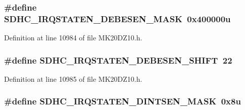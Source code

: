 \subsubsection[{\texorpdfstring{S\+D\+H\+C\+\_\+\+I\+R\+Q\+S\+T\+A\+T\+E\+N\+\_\+\+D\+E\+B\+E\+S\+E\+N\+\_\+\+M\+A\+SK}{SDHC_IRQSTATEN_DEBESEN_MASK}}]{\setlength{\rightskip}{0pt plus 5cm}\#define S\+D\+H\+C\+\_\+\+I\+R\+Q\+S\+T\+A\+T\+E\+N\+\_\+\+D\+E\+B\+E\+S\+E\+N\+\_\+\+M\+A\+SK~0x400000u}\hypertarget{group___s_d_h_c___register___masks_ga1a3c5402282178d4d694355f5bca0870}{}\label{group___s_d_h_c___register___masks_ga1a3c5402282178d4d694355f5bca0870}


Definition at line 10984 of file M\+K20\+D\+Z10.\+h.

\subsubsection[{\texorpdfstring{S\+D\+H\+C\+\_\+\+I\+R\+Q\+S\+T\+A\+T\+E\+N\+\_\+\+D\+E\+B\+E\+S\+E\+N\+\_\+\+S\+H\+I\+FT}{SDHC_IRQSTATEN_DEBESEN_SHIFT}}]{\setlength{\rightskip}{0pt plus 5cm}\#define S\+D\+H\+C\+\_\+\+I\+R\+Q\+S\+T\+A\+T\+E\+N\+\_\+\+D\+E\+B\+E\+S\+E\+N\+\_\+\+S\+H\+I\+FT~22}\hypertarget{group___s_d_h_c___register___masks_ga7911ed6d7633685d285f4934e301bde6}{}\label{group___s_d_h_c___register___masks_ga7911ed6d7633685d285f4934e301bde6}


Definition at line 10985 of file M\+K20\+D\+Z10.\+h.

\subsubsection[{\texorpdfstring{S\+D\+H\+C\+\_\+\+I\+R\+Q\+S\+T\+A\+T\+E\+N\+\_\+\+D\+I\+N\+T\+S\+E\+N\+\_\+\+M\+A\+SK}{SDHC_IRQSTATEN_DINTSEN_MASK}}]{\setlength{\rightskip}{0pt plus 5cm}\#define S\+D\+H\+C\+\_\+\+I\+R\+Q\+S\+T\+A\+T\+E\+N\+\_\+\+D\+I\+N\+T\+S\+E\+N\+\_\+\+M\+A\+SK~0x8u}\hypertarget{group___s_d_h_c___register___masks_ga3e226429fe18b447810a75373b0e4e80}{}\label{group___s_d_h_c___register___masks_ga3e226429fe18b447810a75373b0e4e80}


